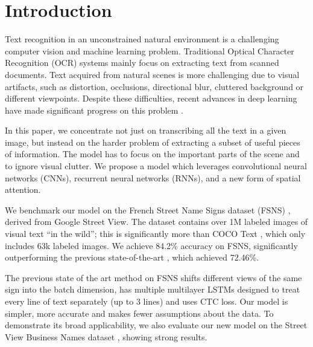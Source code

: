 \documentclass[conference]{IEEEtran}
\begin{document}
 \section{Introduction}
\label{introduction}

Text recognition in an unconstrained natural environment is a
challenging computer vision and machine learning problem. Traditional Optical Character Recognition (OCR) systems mainly
focus on extracting text from scanned documents. Text acquired from
natural scenes is more challenging due to visual artifacts, such as
distortion, occlusions, directional blur, cluttered background or
different viewpoints. Despite these difficulties, recent advances in
deep learning have made significant progress on this problem
\cite{he2016text,wang2011end,Jaderberg2016,karatzas2015icdar,veit16cocotext,Iwamura2016}.     

In this paper, we concentrate not just on transcribing all the text in a
given image, but instead on the harder problem of extracting a subset
of useful pieces of
information. The model has to focus on the important parts of the
scene and to ignore visual clutter. We propose a model which
leverages convolutional neural networks (CNNs), recurrent neural
networks (RNNs), and a new form of spatial attention.

We benchmark our model on the French Street Name Signs dataset (FSNS)
\cite{smith2016end}, derived from Google Street View. The dataset
contains over 1M labeled images of 
visual text ``in the wild''; this is significantly more than COCO Text
\cite{veit16cocotext}, which only includes 63k labeled images. 
We achieve 84.2\% accuracy on FSNS,  significantly outperforming
the previous state-of-the-art \cite{smith2016end}, which achieved
72.46\%.

The previous state of the art method on FSNS
\cite{smith2016end} shifts different views of the same sign into the batch dimension, has multiple multilayer LSTMs designed to treat every line of text separately (up to 3 lines) and uses CTC loss. Our model is simpler, more accurate and makes fewer assumptions about the data.
To demonstrate its broad applicability, 
we also evaluate our new model on
the Street View Business
Names dataset \cite{yu2015large}, showing strong results.
\end{document}
